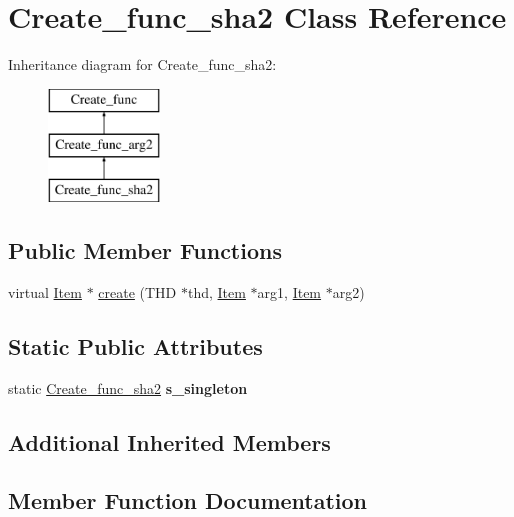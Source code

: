 \hypertarget{classCreate__func__sha2}{}\section{Create\+\_\+func\+\_\+sha2 Class Reference}
\label{classCreate__func__sha2}
Inheritance diagram for Create\+\_\+func\+\_\+sha2\+:\begin{figure}[H]
\begin{center}
\leavevmode
\includegraphics[height=3.000000cm]{classCreate__func__sha2}
\end{center}
\end{figure}
\subsection*{Public Member Functions}
\begin{DoxyCompactItemize}
\item 
virtual \mbox{\hyperlink{classItem}{Item}} $\ast$ \mbox{\hyperlink{classCreate__func__sha2_acbd35a5d8fd11b8342f49b151ef5ac64}{create}} (T\+HD $\ast$thd, \mbox{\hyperlink{classItem}{Item}} $\ast$arg1, \mbox{\hyperlink{classItem}{Item}} $\ast$arg2)
\end{DoxyCompactItemize}
\subsection*{Static Public Attributes}
\begin{DoxyCompactItemize}
\item 
\mbox{\label{classCreate__func__sha2_a4bd432368bd289fd436f1be59b943331}} 
static \mbox{\hyperlink{classCreate__func__sha2}{Create\+\_\+func\+\_\+sha2}} {\bfseries s\+\_\+singleton}
\end{DoxyCompactItemize}
\subsection*{Additional Inherited Members}


\subsection{Member Function Documentation}
\mbox{\label{classCreate__func__sha2_acbd35a5d8fd11b8342f49b151ef5ac64}} 
